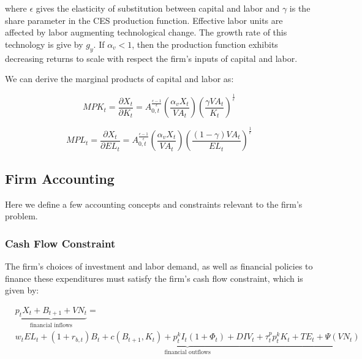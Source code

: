 \noindent\noindent where $\epsilon$ gives the elasticity of substitution between capital and labor and $\gamma$ is the share parameter in the CES production function.  Effective labor units are affected by labor augmenting technological change.  The growth rate of this technology is give by $g_{y}$.  If $\alpha_{v}<1$, then the production function exhibits decreasing returns to scale with respect the firm's inputs of capital and labor.

We can derive the marginal products of capital and labor as:

\begin{equation}
\label{eqn:mpk}
MPK_{t}=\frac{\partial X_{t}}{\partial K_{t}}=A_{0,t}^{\frac{\epsilon-1}{\epsilon}} \left(\frac{\alpha_{v}X_{t}}{VA_{t}}\right)\left(\frac{\gamma VA_{t}}{K_{t}}\right)^{\frac{1}{\epsilon}}
\end{equation}

\begin{equation}
\label{eqn:mpl}
MPL_{t}=\frac{\partial X_{t}}{\partial EL_{t}}=A_{0,t}^{\frac{\epsilon-1}{\epsilon}} \left(\frac{\alpha_{v}X_{t}}{VA_{t}}\right)\left(\frac{(1-\gamma) VA_{t}}{EL_{t}}\right)^{\frac{1}{\epsilon}}
\end{equation}


\subsection{Firm Accounting}

Here we define a few accounting concepts and constraints relevant to the firm's problem.

\subsubsection{Cash Flow Constraint}
The firm's choices of investment and labor demand, as well as financial policies to finance these expenditures must satisfy the firm's cash flow constraint, which is given by:

\begin{equation}
\label{eqn:cash_flow}
\begin{split}
& \underbrace{p_{t}X_{t}+B_{t+1}+VN_{t}}_{\text{financial inflows}} =\\
 & \underbrace{w_{t}EL_{t} + (1+r_{b,t})B_{t} + c(B_{t+1},K_{t}) + p^{k}_{t}I_{t}(1+\Phi_{t}) + DIV_{t} + \tau^{p}_{t}p^{k}_{t}K_{t} + TE_{t} + \Psi(VN_{t})}_{\text{financial outflows}}
\end{split}
\end{equation}

